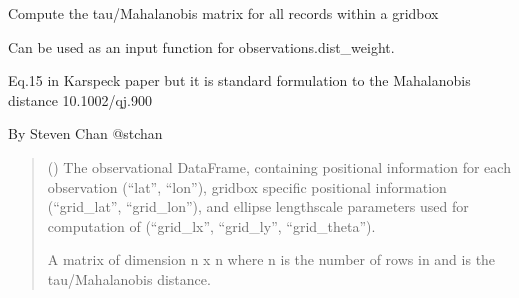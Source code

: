 \documentclass[letterpaper,10pt,english]{sphinxmanual}
\begin{document}
\begin{fulllineitems}
\label{\detokenize{misc:glomar_gridding.distances.tau_dist_from_frame}}
\pysigstartsignatures
\pysiglinewithargsret
{}
{}
{}
\pysigstopsignatures
\sphinxAtStartPar
Compute the tau/Mahalanobis matrix for all records within a gridbox

\sphinxAtStartPar
Can be used as an input function for observations.dist\_weight.

\sphinxAtStartPar
Eq.15 in Karspeck paper
but it is standard formulation to the
Mahalanobis distance
10.1002/qj.900

\sphinxAtStartPar
By Steven Chan \sphinxhyphen{} @stchan
\begin{quote}\begin{description}
\sphinxAtStartPar
{} () \textendash{} The observational DataFrame, containing positional information for each
observation (“lat”, “lon”), gridbox specific positional information
(“grid\_lat”, “grid\_lon”), and ellipse length\sphinxhyphen{}scale parameters used for
computation of  (“grid\_lx”, “grid\_ly”, “grid\_theta”).

\sphinxAtStartPar
{} \textendash{} A matrix of dimension n x n where n is the number of rows in  and
is the tau/Mahalanobis distance.

\sphinxAtStartPar
{}

\end{description}\end{quote}

\end{fulllineitems}
\end{document}
